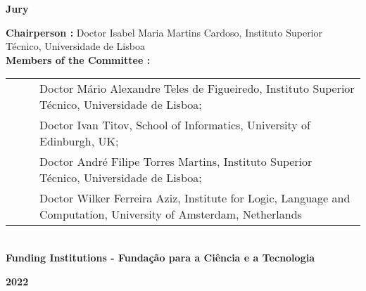 \begin{flushleft}
    \large \textbf{Jury}\\
    \vspace{3mm}
    \raggedright\large \textbf{Chairperson :} Doctor Isabel Maria Martins Cardoso, Instituto Superior Técnico, Universidade de Lisboa\\
    \vspace{3mm}
    \large \textbf{Members of the Committee :}\\ %
    \vspace{3mm}
    \begin{minipage}{\textwidth}
        \begin{tabularx}{1.1\textwidth}{ l @{ } p{} }
            ~~~ & Doctor Mário Alexandre Teles de Figueiredo, Instituto Superior Técnico, Universidade de Lisboa;                  \\
                & Doctor Ivan Titov, School of Informatics, University of Edinburgh, UK;                                           \\
                & Doctor André Filipe Torres Martins, Instituto Superior Técnico, Universidade de Lisboa;                          \\
                & Doctor Wilker Ferreira Aziz, Institute for Logic, Language and Computation, University of Amsterdam, Netherlands \\
        \end{tabularx}
    \end{minipage}\\
    \centering
    \vspace{5mm}\large \textbf{Funding Institutions - Fundação para a Ciência e a Tecnologia}\\
    \vspace{10mm}

    \large \textbf{2022} \\
    \let\thepage\relax
\end{flushleft}
\pagebreak
